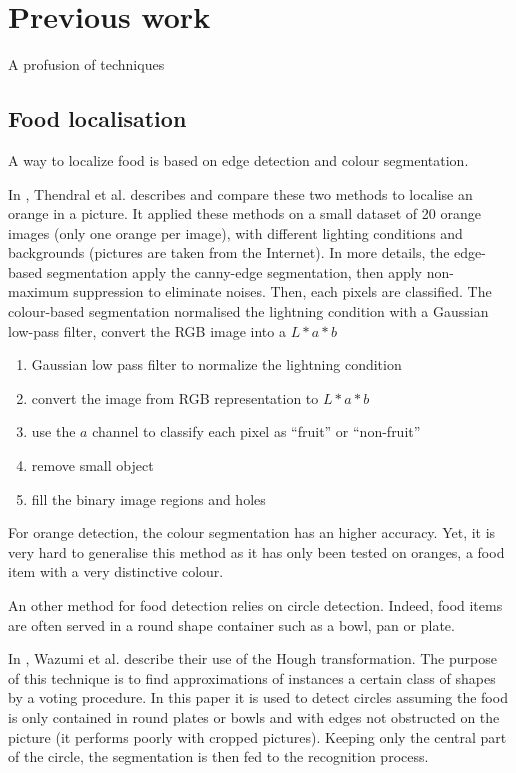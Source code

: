 \chapter{Previous work} \label{sec:previous_work}

A profusion of techniques 

\section{Food localisation}


A way to localize food is based on edge detection and colour segmentation.

In \cite{Thendral2014a}, Thendral et al. describes and compare these two methods to localise an orange in a picture. It applied these methods on a small dataset of 20 orange images (only one orange per image), with different lighting conditions and backgrounds (pictures are taken from the Internet).
In more details, the edge-based segmentation apply the canny-edge segmentation, then apply non-maximum suppression to eliminate noises. Then, each pixels are classified.
The colour-based segmentation normalised the lightning condition with a Gaussian low-pass filter, convert the RGB image into a $L * a * b$
\begin{enumerate}
    \item Gaussian low pass filter to normalize the lightning condition
    \item convert the image from RGB representation to $L * a * b$
    \item use the $a$ channel to classify each pixel as \enquote{fruit} or \enquote{non-fruit}
    \item remove small object
    \item fill the binary image regions and holes
\end{enumerate}
For orange detection, the colour segmentation has an higher accuracy. Yet, it is very hard to generalise this method as it has only been tested on oranges, a food item with a very distinctive colour.


An other method for food detection relies on circle detection. Indeed, food items are often served in a round shape container such as a bowl, pan or plate.

In \cite{Wazumi2011}, Wazumi et al. describe their use of the Hough transformation. The purpose of this technique is to find approximations of instances a certain class of shapes by a voting procedure. In this paper it is used to detect circles assuming the food is only contained in round plates or bowls and with edges not obstructed on the picture (it performs poorly with cropped pictures). Keeping only the central part of the circle, the segmentation is then fed to the recognition process.

